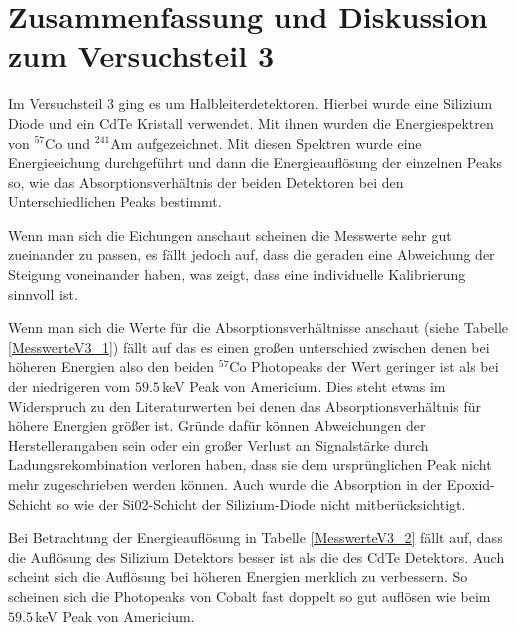\section{Zusammenfassung und Diskussion zum Versuchsteil 3}
Im Versuchsteil 3 ging es um Halbleiterdetektoren. Hierbei wurde eine Silizium Diode und ein CdTe Kristall verwendet. Mit ihnen wurden die Energiespektren von $^57$Co und $^241$Am aufgezeichnet. Mit diesen Spektren wurde eine Energieeichung durchgeführt und dann die Energieauflösung der einzelnen Peaks so, wie das Absorptionsverhältnis der beiden Detektoren bei den Unterschiedlichen Peaks bestimmt.\par
Wenn man sich die Eichungen anschaut scheinen die Messwerte sehr gut zueinander zu passen, es fällt jedoch auf, dass die geraden eine Abweichung der Steigung voneinander haben, was zeigt, dass eine individuelle Kalibrierung sinnvoll ist.\par

Wenn man sich die Werte für die Absorptionsverhältnisse anschaut (siehe Tabelle \ref{MesswerteV3_1}) fällt auf das es einen großen unterschied zwischen denen bei höheren Energien also den beiden $^57$Co Photopeaks der Wert geringer ist als bei der niedrigeren vom $59.5\,$keV Peak von Americium. Dies steht etwas im Widerspruch zu den Literaturwerten bei denen das Absorptionsverhältnis für höhere Energien größer ist. Gründe dafür können Abweichungen der Herstellerangaben sein oder ein großer Verlust an Signalstärke durch Ladungsrekombination verloren haben, dass sie dem ursprünglichen Peak nicht mehr zugeschrieben werden können. Auch wurde die Absorption in der Epoxid-Schicht so wie der Si02-Schicht der Silizium-Diode nicht mitberücksichtigt.\par
Bei Betrachtung der Energieauflösung in Tabelle \ref{MesswerteV3_2} fällt auf, dass die Auflösung des Silizium Detektors besser ist als die des CdTe Detektors. Auch scheint sich die Auflösung bei höheren Energien merklich zu verbessern. So scheinen sich die Photopeaks von Cobalt fast doppelt so gut auflösen wie beim $59.5$\,keV Peak von Americium.
